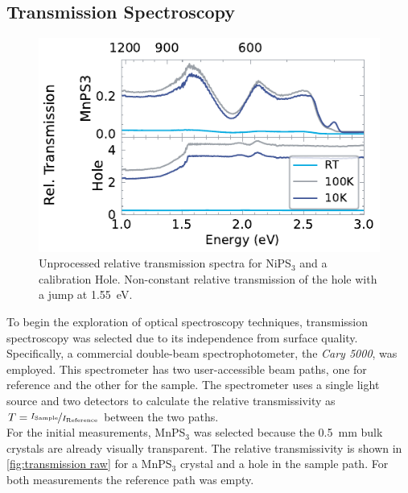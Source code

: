 \documentclass[
	twoside,
	parskip=half,
	a4paper,
]{scrbook}
\begin{document}
\subsection{Transmission Spectroscopy}
\begin{figure}
	\centering
	\includegraphics{../figures/2024-03-15 MnPS3 transmission raw.pdf}
	\caption{Unprocessed relative transmission spectra for NiPS$_3$ and a calibration Hole. Non-constant relative transmission of the hole with a jump at \SI{1.55}{eV}.}
	\label{fig:transmission raw}
\end{figure}
To begin the exploration of optical spectroscopy techniques, transmission spectroscopy was selected due to its independence from surface quality.
Specifically, a commercial double-beam spectrophotometer, the \textit{Cary 5000}, was employed.
This spectrometer has two user-accessible beam paths, one for reference and the other for the sample.
The spectrometer uses a single light source and two detectors to calculate the relative transmissivity as $T = \nicefrac{I_\text{Sample}}{I_\text{Reference}}$ between the two paths.\\
For the initial measurements, MnPS$_3$ was selected because the \SI{.5}{mm} bulk crystals are already visually transparent.
The relative transmissivity is shown in \autoref{fig:transmission raw} for a MnPS$_3$ crystal and a hole in the sample path. For both measurements the reference path was empty.\\
\end{document}
